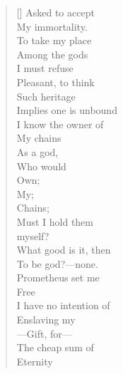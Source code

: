 \documentclass{article}
\begin{document}
\newpage
{}
\settowidth{\versewidth}{Than Tycho Brahe, or Erra Pater:}
\begin{verse}[\versewidth]
Asked to accept \\
My immortality. \\
To take my place \\
Among the gods \\
I must refuse \\
Pleasant, to think \\
Such heritage \\
Implies one is unbound \\
I know the owner of \\
My chains \\
As a god, \\
Who would \\
Own; \\
My; \\
Chains; \\
Must I hold them \\
\tab myself? \\
What good is it, then \\
To be god?––none. \\
Prometheus set me \\
Free \\
I have no intention of \\
Enslaving my \\
––Gift, for–– \\
The cheap sum of \\
Eternity \\
\end{verse}
\end{document}
